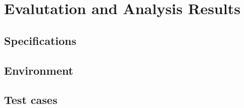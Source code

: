 \chapter*{Evalutation and Analysis Results}
\section*{Specifications}
\section*{Environment}
\section*{Test cases}
